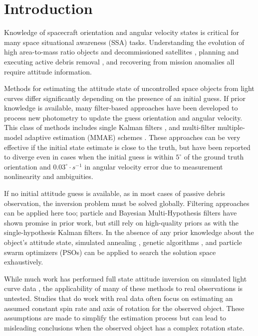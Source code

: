 \documentclass[a4paper,twocolumn]{spaceDebrisC} %
\begin{document}
\section{Introduction}

Knowledge of spacecraft orientation and angular velocity states is critical for many space situational awareness (SSA) tasks. Understanding the evolution of high area-to-mass ratio objects \cite{frueh2014} and decommissioned satellites \cite{rachman2023}, planning and executing active debris removal \cite{bonnal2013}, and recovering from mission anomalies \cite{umansky2023} all require attitude information. 

Methods for estimating the attitude state of uncontrolled space objects from light curves differ significantly depending on the presence of an initial guess. If prior knowledge is available, many filter-based approaches have been developed to process new photometry to update the guess orientation and angular velocity. This class of methods includes single Kalman filters \cite{burton2021two, gagnon2024, wetterer2009}, and multi-filter multiple-model adaptive estimation (MMAE) schemes \cite{linares2014space, dianetti2020}. These approaches can be very effective if the initial state estimate is close to the truth, but have been reported to diverge even in cases when the initial guess is within $5^\circ$ of the ground truth orientation and $0.03^\circ\cdot s^{-1}$ in angular velocity error \cite{gagnon2024} due to measurement nonlinearity and ambiguities.

If no initial attitude guess is available, as in most cases of passive debris observation, the inversion problem must be solved globally. Filtering approaches can be applied here too; particle \cite{linares2014particle, holzinger2014} and Bayesian Multi-Hypothesis filters \cite{burton2021two, cabrera2023} have shown promise in prior work, but still rely on high-quality priors as with the single-hypothesis Kalman filters. In the absence of any prior knowledge about the object's attitude state, simulated annealing \cite{gagnon2024, clark2020}, genetic algorithms \cite{gagnon2024, piergentili2017, clark2020}, and particle swarm optimizers (PSOs) \cite{clark2020, clark2022, burton2024journal, burton2024scitech, gagnon2024, gagnon2025} can be applied to search the solution space exhaustively.

While much work has performed full state attitude inversion on simulated light curve data \cite{burton2024journal, gagnon2024, robinson2025att}, the applicability of many of these methods to real observations is untested. Studies that do work with real data often focus on estimating an assumed constant spin rate and axis of rotation for the observed object. These assumptions are made to simplify the estimation process but can lead to misleading conclusions when the observed object has a complex rotation state.
\end{document}
